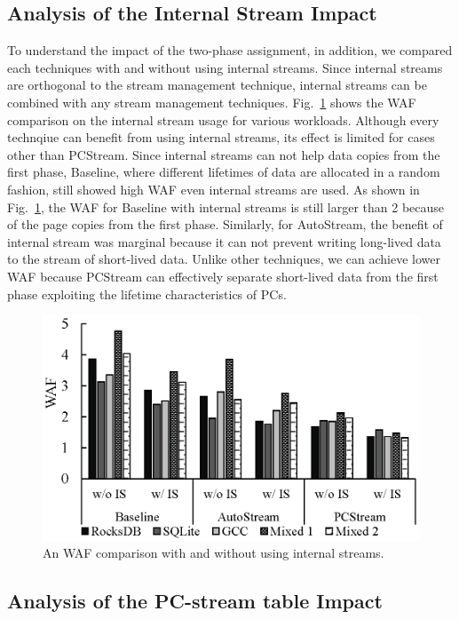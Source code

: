 \subsection{Analysis of the Internal Stream Impact}

To understand the impact of the
two-phase assignment, in addition, we compared each techniques
with and without using internal streams.
Since internal streams are orthogonal to the stream management technique,
internal streams can be combined with any stream management techniques.
Fig.~\ref{fig:internal} shows the WAF comparison on the internal stream usage 
for various workloads.
Although every technqiue can benefit from using internal streams,
its effect is limited for cases other than PCStream.
Since internal streams can not help data copies from the first phase,
Baseline, where different lifetimes of data 
are allocated in a random fashion, still showed high WAF even internal streams are used.
As shown in Fig.~\ref{fig:internal}, the WAF for Baseline with internal streams is still 
larger than 2 because of the page copies from the first phase.
Similarly, for AutoStream, the benefit of internal stream was marginal 
because it can not prevent writing long-lived data to the stream of short-lived data.
Unlike other techniques, we can achieve lower WAF because PCStream can effectively 
separate short-lived data from the first phase exploiting the lifetime characteristics of PCs.


\begin{figure}[t]
	\centering
	\includegraphics[width=0.9\linewidth]{figure/internal}
	\caption{An WAF comparison with and without using internal streams.}
	\label{fig:internal}
\end{figure}


\subsection{Analysis of the PC-stream table Impact}

